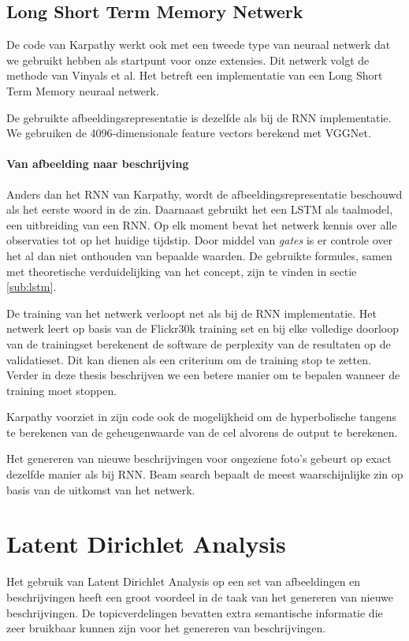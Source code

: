 \subsection{Long Short Term Memory Netwerk}
\label{sec:lstm}
De code van Karpathy werkt ook met een tweede type van neuraal netwerk dat we gebruikt hebben als startpunt voor onze extensies. Dit netwerk volgt de methode van Vinyals et al.\cite{Google} Het betreft een implementatie van een Long Short Term Memory neuraal netwerk. 

De gebruikte afbeeldingsrepresentatie is dezelfde als bij de RNN implementatie. We gebruiken de 4096-dimensionale feature vectors berekend met VGGNet. 

\paragraph{Van afbeelding naar beschrijving}
Anders dan het RNN van Karpathy, wordt de afbeeldingsrepresentatie beschouwd als het eerste woord in de zin. Daarnaast gebruikt het een LSTM als taalmodel, een uitbreiding van een RNN. Op elk moment bevat het netwerk kennis over alle observaties tot op het huidige tijdstip. Door middel van \emph{gates} is er controle over het al dan niet onthouden van bepaalde waarden. De gebruikte formules, samen met theoretische verduidelijking van het concept, zijn te vinden in sectie \ref{sub:lstm}.

De training van het netwerk verloopt net als bij de RNN implementatie. Het netwerk leert op basis van de Flickr30k training set en bij elke volledige doorloop van de trainingset berekenent de software de perplexity van de resultaten op de validatieset. Dit kan dienen als een criterium om de training stop te zetten. Verder in deze thesis beschrijven we een betere manier om te bepalen wanneer de training moet stoppen.

Karpathy voorziet in zijn code ook de mogelijkheid om de hyperbolische tangens te berekenen van de geheugenwaarde van de cel alvorens de output te berekenen. 

Het genereren van nieuwe beschrijvingen voor ongeziene foto's gebeurt op exact dezelfde manier als bij RNN. Beam search bepaalt de meest waarschijnlijke zin op basis van de uitkomst van het netwerk.



\section{Latent Dirichlet Analysis}
Het gebruik van Latent Dirichlet Analysis op een set van afbeeldingen en beschrijvingen heeft een groot voordeel in de taak van het genereren van nieuwe beschrijvingen. De topicverdelingen bevatten extra semantische informatie die zeer bruikbaar kunnen zijn voor het genereren van beschrijvingen.

